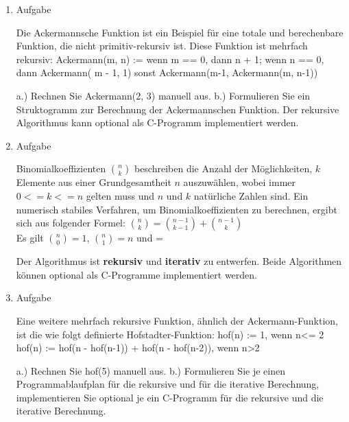 \documentclass[12pt,a4paper]{scrreprt}
\begin{document}
\begin{enumerate}
\begin{comment}
\begin{lstlisting}
unsigned long long fibi(unsigned char n){
	unsigned long long *f;
	unsigned long long i,r;
	if(n<=14)return (unsigned long long)n;
	f=(unsigned long long*)malloc((n+1)*sizeof(unsigned lon long));
	f[0]=0ULL;//zwei elm reichen statt 
	f[1]=1ULL;
	for(i=2U ; i<=n ; i++){
		f[i]=f[i-1]+f[i-1];
	}
	r=f[n];
	free(f);
	return f[i-1];
}
\end{lstlisting}

\end{comment}

\item Aufgabe %

Die Ackermannsche Funktion ist ein Beispiel für eine totale und berechenbare
Funktion, die nicht primitiv-rekursiv ist. Diese Funktion ist mehrfach rekursiv:
Ackermann(m, n) := wenn m == 0, dann n + 1;
wenn n == 0, dann Ackermann( m - 1, 1)
sonst Ackermann(m-1, Ackermann(m, n-1))

a.) Rechnen Sie Ackermann(2, 3) manuell aus.
b.) Formulieren Sie ein Struktogramm zur Berechnung der Ackermannschen Funktion.
Der rekursive Algorithmus kann optional als C-Programm implementiert werden.

\item Aufgabe %

Binomialkoeffizienten $\binom{n}{k}$ beschreiben die Anzahl der Möglichkeiten, $k$ Elemente aus einer Grundgesamtheit $n$ auszuwählen, wobei immer $0 <= k <= n$ gelten muss und $n$ und $k$ natürliche Zahlen sind. Ein numerisch stabiles Verfahren, um Binomialkoeffizienten zu berechnen, ergibt sich aus folgender Formel:
$\binom{n}{k} = \binom{n-1}{k-1}+\binom{n-1}{k}$ \\
Es gilt $\binom{n}{0}=1$, $\binom{n}{1}=n$ und =

Der Algorithmus ist \textbf{rekursiv} und \textbf{iterativ} zu entwerfen. Beide Algorithmen können optional als C-Programme implementiert werden.

\begin{comment}
n ueber k mit einer matrix

iterativ
\begin{tabular}
0 & k	\\
n & 1 & 0 & 0 & 0	\\
  & ... & 1 & 1 & 0	\\
  & 1 & 2
\end{tabular}

\end{comment}

\item Aufgabe %

Eine weitere mehrfach rekursive Funktion, ähnlich der Ackermann-Funktion, ist die wie folgt definierte Hofstadter-Funktion:
hof(n) := 1, wenn n<= 2
hof(n) := hof(n - hof(n-1)) + hof(n - hof(n-2)), wenn n>2

a.) Rechnen Sie hof(5) manuell aus.
b.) Formulieren Sie je einen Programmablaufplan für die rekursive und für die iterative Berechnung, implementieren Sie optional je ein C-Programm für die rekursive und die iterative Berechnung.

\end{enumerate}
\end{document}
